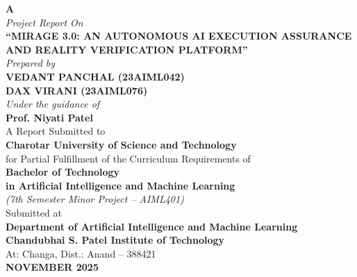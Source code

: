 \documentclass[12pt,a4paper]{report}
\numberwithin{equation}{section}
\begin{document}
\begin{titlepage}
\thispagestyle{empty}
\begin{center}
    \vspace*{0.2cm}
    {\fontsize{14pt}{16pt}\selectfont \textbf{A}}\\[0.2cm]
    {\fontsize{12pt}{14pt}\selectfont \textit{Project Report On}}\\[0.6cm]
    
    {\fontsize{14pt}{18pt}\selectfont \textbf{``MIRAGE 3.0: AN AUTONOMOUS AI EXECUTION ASSURANCE AND REALITY VERIFICATION PLATFORM''}}\\[1.0cm]
    
    {\fontsize{12pt}{14pt}\selectfont \textit{Prepared by}}\\[0.3cm]
    {\fontsize{13pt}{15pt}\selectfont \textbf{VEDANT PANCHAL (23AIML042)}}\\[0.2cm]
    {\fontsize{13pt}{15pt}\selectfont \textbf{DAX VIRANI (23AIML076)}}\\[1.0cm]
    
    {\fontsize{12pt}{14pt}\selectfont \textit{Under the guidance of}}\\[0.3cm]
    {\fontsize{12pt}{14pt}\selectfont \textbf{Prof. Niyati Patel}}\\[1.0cm]
    
    {\fontsize{12pt}{14pt}\selectfont A Report Submitted to}\\[0.2cm]
    {\fontsize{14pt}{16pt}\selectfont \textbf{Charotar University of Science and Technology}}\\[0.2cm]
    {\fontsize{11pt}{13pt}\selectfont for Partial Fulfillment of the Curriculum Requirements of}\\[0.2cm]
    {\fontsize{13pt}{15pt}\selectfont \textbf{Bachelor of Technology}}\\[0.2cm]
    {\fontsize{12pt}{14pt}\selectfont \textbf{in Artificial Intelligence and Machine Learning}}\\[0.2cm]
    {\fontsize{11pt}{13pt}\selectfont \textit{(7th Semester Minor Project -- AIML401)}}\\[1.0cm]
    
    {\fontsize{11pt}{13pt}\selectfont Submitted at}\\[0.2cm]
    {\fontsize{13pt}{15pt}\selectfont \textbf{Department of Artificial Intelligence and Machine Learning}}\\[0.2cm]
    {\fontsize{14pt}{16pt}\selectfont \textbf{Chandubhai S. Patel Institute of Technology}}\\[0.2cm]
    {\fontsize{12pt}{14pt}\selectfont At: Changa, Dist.: Anand -- 388421}\\[0.4cm]
    {\fontsize{12pt}{14pt}\selectfont \textbf{NOVEMBER 2025}}
\end{center}
\end{titlepage}
\end{document}
